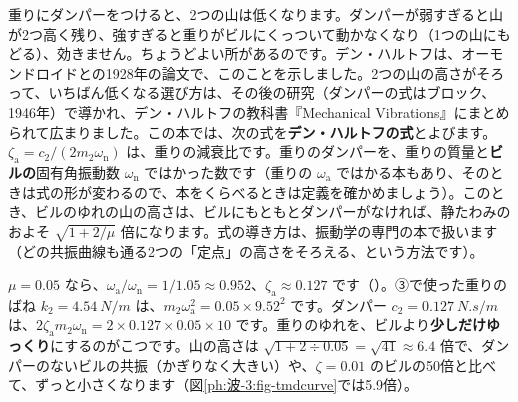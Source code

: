 重りにダンパーをつけると、2つの山は低くなります。ダンパーが弱すぎると山が2つ高く残り、強すぎると重りがビルにくっついて動かなくなり（1つの山にもどる）、効きません。ちょうどよい所があるのです。デン・ハルトフは、オーモンドロイドとの1928年の論文で、このことを示しました。2つの山の高さがそろって、いちばん低くなる選び方は、その後の研究（ダンパーの式はブロック、1946年）で導かれ、デン・ハルトフの教科書『Mechanical Vibrations』にまとめられて広まりました。この本では、次の式を\textbf{デン・ハルトフの式}とよびます。
$\zeta_{\mathrm a}=c_2/(2m_2\omega_{\mathrm n})$ は、重りの減衰比です。重りのダンパーを、重りの質量と\textbf{ビルの}固有角振動数 $\omega_{\mathrm n}$ ではかった数です（重りの $\omega_{\mathrm a}$ ではかる本もあり、そのときは式の形が変わるので、本をくらべるときは定義を確かめましょう）。このとき、ビルのゆれの山の高さは、ビルにもともとダンパーがなければ、静たわみのおよそ $\sqrt{1+2/\mu}$ 倍になります。式の導き方は、振動学の専門の本で扱います（どの共振曲線も通る2つの「定点」の高さをそろえる、という方法です）。

$\mu=0.05$ なら、$\omega_{\mathrm a}/\omega_{\mathrm n}=1/1.05\approx0.952$、$\zeta_{\mathrm a}\approx0.127$ です（）。③で使った重りのばね $k_2=\qty{4.54}{N/m}$ は、$m_2\omega_{\mathrm a}^2=0.05\times9.52^2$ です。ダンパー $c_2=\qty{0.127}{N.s/m}$ は、$2\zeta_{\mathrm a}m_2\omega_{\mathrm n}=2\times0.127\times0.05\times10$ です。重りのゆれを、ビルより\textbf{少しだけゆっくり}にするのがこつです。山の高さは $\sqrt{1+2\div0.05}=\sqrt{41}\approx6.4$ 倍で、ダンパーのないビルの共振（かぎりなく大きい）や、$\zeta=0.01$ のビルの50倍と比べて、ずっと小さくなります（図\ref{ph:波-3:fig-tmdcurve}では5.9倍）。


